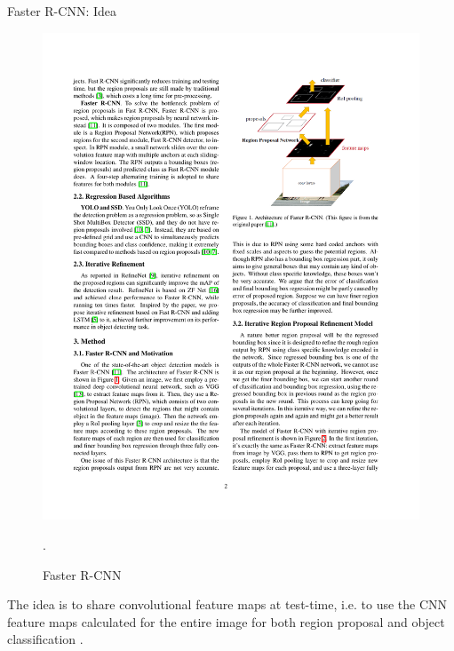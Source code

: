 \documentclass[xcolor=pdftex,dvipsnames,table]{beamer}
\begin{document}
\begin{frame}{Faster R-CNN: Idea}
\begin{figure}[htb]
   \centering
   \includegraphics[width=0.4\textheight]{../graphics/Faster_R-CNN2.pdf}
   \caption{Faster R-CNN \cite{Ren2017}}.
\end{figure}
The idea is to share convolutional feature maps at test-time, i.e. to use the CNN feature maps calculated for the entire image for both region proposal and object classification \cite{Ren2017}. 
\end{frame}
\end{document}
